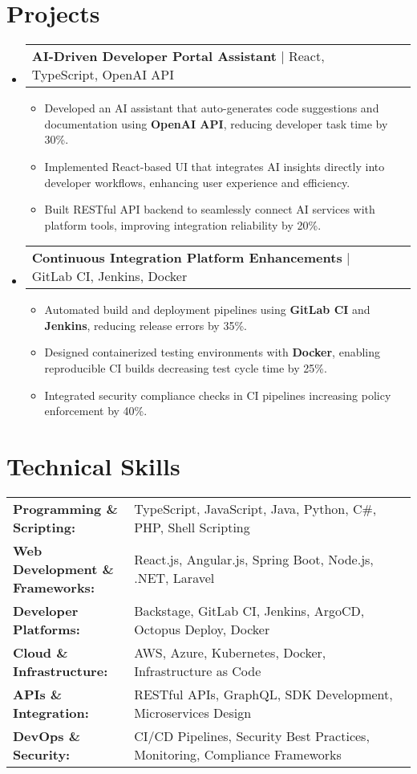 \documentclass[letterpaper,11pt]{article}
\makeatletter
\newcommand{\resumeItem}[1]{
  \item\footnotesize{
    {#1 \vspace{-2pt}}
  }
}
\newcommand{\resumeProjectHeading}[2]{
    \item
    \begin{tabular*}{1.001\textwidth}{l@{\extracolsep{\fill}}r}
      \small#1 & \textbf{\small #2}\\
    \end{tabular*}\vspace{-7pt}
}
\newcommand{\resumeSubHeadingListStart}{\begin{itemize}[leftmargin=0pt, label={}]}
\newcommand{\resumeSubHeadingListEnd}{\end{itemize}}
\newcommand{\resumeItemListStart}{\begin{itemize}[leftmargin=*]}
\newcommand{\resumeItemListEnd}{\end{itemize}\vspace{-5pt}}
\makeatother
\begin{document}
\section{Projects}
    \vspace{-5pt}
    \resumeSubHeadingListStart
      \resumeProjectHeading
          {\textbf{AI-Driven Developer Portal Assistant} | React, TypeScript, OpenAI API}{}
          \resumeItemListStart
              \resumeItem{Developed an AI assistant that auto-generates code suggestions and documentation using \textbf{OpenAI API}, reducing developer task time by 30\%.}
              \resumeItem{Implemented React-based UI that integrates AI insights directly into developer workflows, enhancing user experience and efficiency.}
              \resumeItem{Built RESTful API backend to seamlessly connect AI services with platform tools, improving integration reliability by 20\%.}
          \resumeItemListEnd
          \vspace{-16pt}
      \resumeProjectHeading
          {\textbf{Continuous Integration Platform Enhancements} | GitLab CI, Jenkins, Docker}{}
          \resumeItemListStart
              \resumeItem{Automated build and deployment pipelines using \textbf{GitLab CI} and \textbf{Jenkins}, reducing release errors by 35\%.}
              \resumeItem{Designed containerized testing environments with \textbf{Docker}, enabling reproducible CI builds decreasing test cycle time by 25\%.}
              \resumeItem{Integrated security compliance checks in CI pipelines increasing policy enforcement by 40\%.}
          \resumeItemListEnd
    \resumeSubHeadingListEnd
\vspace{-10pt}
\section{Technical Skills}
        \vspace{-14pt}
        \begin{table}[h]
            \footnotesize
            \begin{tabular}{p{0.3\linewidth} p{0.7\linewidth}}
                \textbf{Programming \& Scripting:} & TypeScript, JavaScript, Java, Python, C\#, PHP, Shell Scripting \\
                \textbf{Web Development \& Frameworks:} & React.js, Angular.js, Spring Boot, Node.js, .NET, Laravel \\
                \textbf{Developer Platforms:} & Backstage, GitLab CI, Jenkins, ArgoCD, Octopus Deploy, Docker \\
                \textbf{Cloud \& Infrastructure:} & AWS, Azure, Kubernetes, Docker, Infrastructure as Code \\
                \textbf{APIs \& Integration:} & RESTful APIs, GraphQL, SDK Development, Microservices Design \\
                \textbf{DevOps \& Security:} & CI/CD Pipelines, Security Best Practices, Monitoring, Compliance Frameworks \\
            \end{tabular}
        \end{table}
\end{document}
